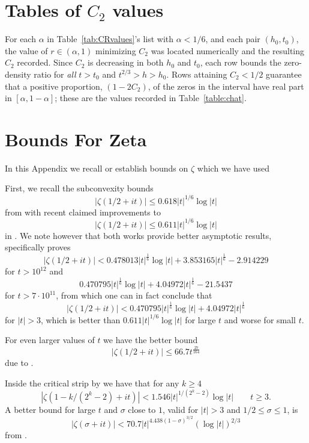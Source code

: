 \documentclass[10pt,english,letter, reqno]{amsart}
\theoremstyle{plain}
\theoremstyle{definition}
\begin{document}
\section{Tables of $C_2$ values}\label{sec:C2tables}

For each $\alpha$ in Table~\ref{tab:CRvalues}'s list with $\alpha<1/6$, and each pair
$(h_0,t_0)$, the value of $r\in(\alpha,1)$ minimizing $C_2$ was located numerically and the
resulting $C_2$ recorded. Since $C_2$ is decreasing in both $h_0$ and $t_0$, each row bounds
the zero-density ratio for \emph{all} $t>t_0$ and $t^{2/3}>h>h_0$. Rows attaining $C_2<1/2$ guarantee that a positive proportion, $(1-2C_2)$, of the zeros in the interval
have real part in $[\alpha,1-\alpha]$; these are the values recorded in Table~\ref{table:chat}.



\appendix
\section{Bounds For Zeta}\label{sec:background}


In this Appendix we recall or establish bounds on $\zeta$ which we have used

First, we recall the subconvexity bounds 
\[  |\zeta(1/2+it)| \leq 0.618 |t|^{1/6} \log|t|\]
from \cite{HiaryPatelYang2024} with recent claimed improvements to
\[   |\zeta(1/2+it)| \leq 0.611 |t|^{1/6} \log|t|\]
in \cite{Revers2026}.
We note however that both works provide better asymptotic results, specifically \cite[Equation~(3.23)]{HiaryPatelYang2024} proves
\[|\zeta(1/2+it)| < 0.478013|t|^{\frac{1}{6}} \log|t| + 3.853165 |t|^{\frac{1}{6}} - 2.914229\]
for $t>10^{12}$ and \cite[Remark~3.1]{Revers2026}
\[0.470795|t|^{\frac{1}{6}}\log|t|+4.04972|t|^{\frac{1}{6}}-21.5437\]
for $t>7\cdot 10^{11}$, from which one can in fact conclude that
\[|\zeta(1/2+it)|  <  0.470795 |t|^{\frac{1}{6}}\log|t|   + 4.04972 |t|^{\frac{1}{6}} \]
for $|t| > 3$, which is better than $0.611 |t|^{1/6} \log|t|$ for large $t$ and worse for small $t$.

For even larger values of $t$ we have the better bound
\[  |\zeta(1/2+it)| \leq 66.7t^{\frac{27}{164}}\]
due to \cite{PatelYang2024}.

Inside the critical strip by \cite{Yang2024} we have that for any $k\geq 4$
\[ |\zeta(1-k/(2^k-2)+it)|< 1.546  |t|^{1/(2^k-2)}\log|t| \qquad t\geq 3.\]
A better bound for large $t$ and $\sigma$ close to $1$, valid for $|t|>3$ and $1/2 \leq \sigma \leq 1$,  is
\[ |\zeta(\sigma+it)|  < 70.7|t|^{4.438(1-\sigma)^{3/2}}(\log|t|)^{2/3} \]
 from \cite{Bellotti2024}.
\end{document}
